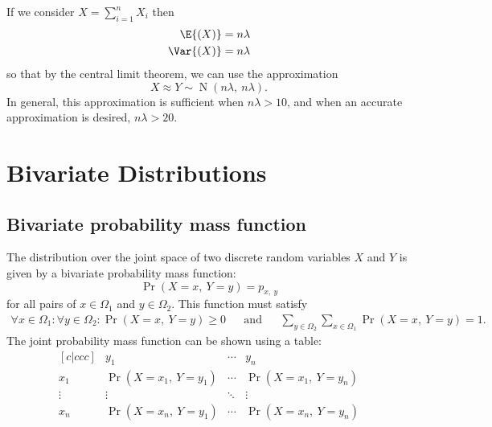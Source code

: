 \documentclass{article}
\begin{document}
\begin{multicols}{3}
    If we consider \(X = \sum_{i = 1}^n X_i\) then
    \begin{align*}
        \E{\left( X \right)}   & = n \lambda \\
        \Var{\left( X \right)} & = n \lambda
    \end{align*}
    so that by the central limit theorem, we can use the approximation
    \begin{equation*}
        X \approx Y \sim \operatorname{N}{\left( n\lambda,\: n\lambda \right)}.
    \end{equation*}
    In general, this approximation is sufficient when \(n \lambda > 10\), and when an accurate approximation is desired, \(n \lambda > 20\).
    \section{Bivariate Distributions}
    \subsection{Bivariate probability mass function}
    The distribution over the joint space of two discrete random variables \(X\) and \(Y\) is given by a bivariate probability mass function:
    \begin{equation*}
        \Pr{\left( X = x,\: Y = y \right)} = p_{x,\: y}
    \end{equation*}
    for all pairs of \(x \in \Omega_1\) and \(y \in \Omega_2\). This function must satisfy
    \begin{align*}
        \forall x \in \Omega_1 : \forall y \in \Omega_2 : \Pr{\left( X = x,\: Y = y \right)} \geq 0 &  & \text{and} &  &
        \sum_{y \in \Omega_2} \sum_{x \in \Omega_1} \Pr{\left( X = x,\: Y = y \right)} = 1.
    \end{align*}
    The joint probability mass function can be shown using a table:
    {\small
    \begin{equation*}
        \begin{matrix}[c|ccc] %
                   & y_1                                    & \cdots & y_n                                    \\
            \hline %
            x_1    & \Pr{\left( X = x_1,\: Y = y_1 \right)} & \cdots & \Pr{\left( X = x_1,\: Y = y_n \right)} \\
            \vdots & \vdots                                 & \ddots & \vdots                                 \\
            x_n    & \Pr{\left( X = x_n,\: Y = y_1 \right)} & \cdots & \Pr{\left( X = x_n,\: Y = y_n \right)}
        \end{matrix}
    \end{equation*}
    }

\end{multicols}
\end{document}
